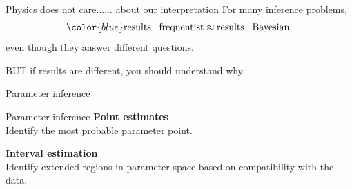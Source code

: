 \documentclass[
aspectratio=169,
14pt,
professionalfonts
]{beamer}
\begin{document}
\begin{frame}{Physics does not care...}{... about our interpretation}
For many inference problems, 
$$\color{blue}
\text{results} \mid \text{frequentist} \approx \text{results} \mid \text{Bayesian},
$$
even though they answer different questions.

\vspace{0.5cm}

BUT if results are different, you should understand why.
\end{frame}

\begin{frame}
\center
\Large
Parameter inference
\end{frame}

\begin{frame}{Parameter inference}
    \center
    \textbf{Point estimates}\\
    Identify the most probable parameter point.

    \vspace{1cm}

    \textbf{Interval estimation}\\
    Identify extended regions in parameter space based on compatibility with the data.
\end{frame}
\end{document}

